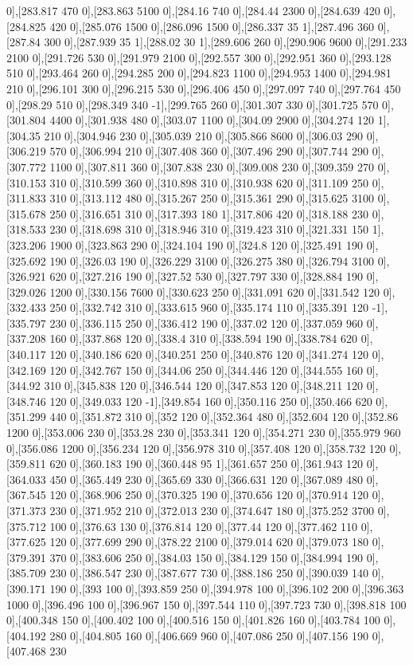 {0],[283.817 470 0],[283.863 5100 0],[284.16 740 0],[284.44 2300 0],[284.639 420 0],[284.825 420 0],[285.076 1500 0],[286.096 1500 0],[286.337 35 1],[287.496 360 0],[287.84 300 0],[287.939 35 1],[288.02 30 1],[289.606 260 0],[290.906 9600 0],[291.233 2100 0],[291.726 530 0],[291.979 2100 0],[292.557 300 0],[292.951 360 0],[293.128 510 0],[293.464 260 0],[294.285 200 0],[294.823 1100 0],[294.953 1400 0],[294.981 210 0],[296.101 300 0],[296.215 530 0],[296.406 450 0],[297.097 740 0],[297.764 450 0],[298.29 510 0],[298.349 340 -1],[299.765 260 0],[301.307 330 0],[301.725 570 0],[301.804 4400 0],[301.938 480 0],[303.07 1100 0],[304.09 2900 0],[304.274 120 1],[304.35 210 0],[304.946 230 0],[305.039 210 0],[305.866 8600 0],[306.03 290 0],[306.219 570 0],[306.994 210 0],[307.408 360 0],[307.496 290 0],[307.744 290 0],[307.772 1100 0],[307.811 360 0],[307.838 230 0],[309.008 230 0],[309.359 270 0],[310.153 310 0],[310.599 360 0],[310.898 310 0],[310.938 620 0],[311.109 250 0],[311.833 310 0],[313.112 480 0],[315.267 250 0],[315.361 290 0],[315.625 3100 0],[315.678 250 0],[316.651 310 0],[317.393 180 1],[317.806 420 0],[318.188 230 0],[318.533 230 0],[318.698 310 0],[318.946 310 0],[319.423 310 0],[321.331 150 1],[323.206 1900 0],[323.863 290 0],[324.104 190 0],[324.8 120 0],[325.491 190 0],[325.692 190 0],[326.03 190 0],[326.229 3100 0],[326.275 380 0],[326.794 3100 0],[326.921 620 0],[327.216 190 0],[327.52 530 0],[327.797 330 0],[328.884 190 0],[329.026 1200 0],[330.156 7600 0],[330.623 250 0],[331.091 620 0],[331.542 120 0],[332.433 250 0],[332.742 310 0],[333.615 960 0],[335.174 110 0],[335.391 120 -1],[335.797 230 0],[336.115 250 0],[336.412 190 0],[337.02 120 0],[337.059 960 0],[337.208 160 0],[337.868 120 0],[338.4 310 0],[338.594 190 0],[338.784 620 0],[340.117 120 0],[340.186 620 0],[340.251 250 0],[340.876 120 0],[341.274 120 0],[342.169 120 0],[342.767 150 0],[344.06 250 0],[344.446 120 0],[344.555 160 0],[344.92 310 0],[345.838 120 0],[346.544 120 0],[347.853 120 0],[348.211 120 0],[348.746 120 0],[349.033 120 -1],[349.854 160 0],[350.116 250 0],[350.466 620 0],[351.299 440 0],[351.872 310 0],[352 120 0],[352.364 480 0],[352.604 120 0],[352.86 1200 0],[353.006 230 0],[353.28 230 0],[353.341 120 0],[354.271 230 0],[355.979 960 0],[356.086 1200 0],[356.234 120 0],[356.978 310 0],[357.408 120 0],[358.732 120 0],[359.811 620 0],[360.183 190 0],[360.448 95 1],[361.657 250 0],[361.943 120 0],[364.033 450 0],[365.449 230 0],[365.69 330 0],[366.631 120 0],[367.089 480 0],[367.545 120 0],[368.906 250 0],[370.325 190 0],[370.656 120 0],[370.914 120 0],[371.373 230 0],[371.952 210 0],[372.013 230 0],[374.647 180 0],[375.252 3700 0],[375.712 100 0],[376.63 130 0],[376.814 120 0],[377.44 120 0],[377.462 110 0],[377.625 120 0],[377.699 290 0],[378.22 2100 0],[379.014 620 0],[379.073 180 0],[379.391 370 0],[383.606 250 0],[384.03 150 0],[384.129 150 0],[384.994 190 0],[385.709 230 0],[386.547 230 0],[387.677 730 0],[388.186 250 0],[390.039 140 0],[390.171 190 0],[393 100 0],[393.859 250 0],[394.978 100 0],[396.102 200 0],[396.363 1000 0],[396.496 100 0],[396.967 150 0],[397.544 110 0],[397.723 730 0],[398.818 100 0],[400.348 150 0],[400.402 100 0],[400.516 150 0],[401.826 160 0],[403.784 100 0],[404.192 280 0],[404.805 160 0],[406.669 960 0],[407.086 250 0],[407.156 190 0],[407.468 230 }
